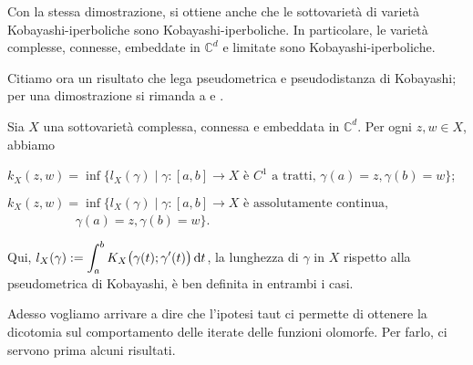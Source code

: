 \begin{oss}
    Con la stessa dimostrazione, si ottiene anche che le sottovarietà di varietà Kobayashi-iperboliche sono Kobayashi-iperboliche. In particolare, le varietà complesse, connesse, embeddate in $\mathbb{C}^d$ e limitate sono Kobayashi-iperboliche.
\end{oss}

Citiamo ora un risultato che lega pseudometrica e pseudodistanza di Kobayashi; per una dimostrazione si rimanda a \cite[Theorem 1]{R} e \cite[Theorem 3.1]{V}.

\begin{thm} \label{lung_int}
    \cite[Result 2.1]{CMS} Sia $X$ una sottovarietà complessa, connessa e embeddata in $\mathbb{C}^d$. Per ogni $z,w \in X$, abbiamo
    \begin{nlist}
        \item $k_X(z,w)=\inf\{l_X(\gamma) \mid \gamma:[a,b] \longrightarrow X\text{ è $C^1$ a tratti, }\gamma(a)=z,\gamma(b)=w\}$;
        \item $k_X(z,w)=\inf\{l_X(\gamma) \mid \gamma:[a,b] \longrightarrow X\text{ è assolutamente continua,}$\\
        $\text{    }\qquad\qquad\,\,\,\,\gamma(a)=z,\gamma(b)=w\}$.
    \end{nlist}
    Qui, $l_X(\gamma):=\displaystyle\int_a^b K_X\big(\gamma(t);\gamma'(t)\big)\mathop{}\!\mathrm{d} t$, la \textnormal{lunghezza di $\gamma$ in $X$ rispetto alla pseudometrica di Kobayashi}, è ben definita in entrambi i casi.
\end{thm}

Adesso vogliamo arrivare a dire che l'ipotesi taut ci permette di ottenere la dicotomia sul comportamento delle iterate delle funzioni olomorfe. Per farlo, ci servono prima alcuni risultati.

